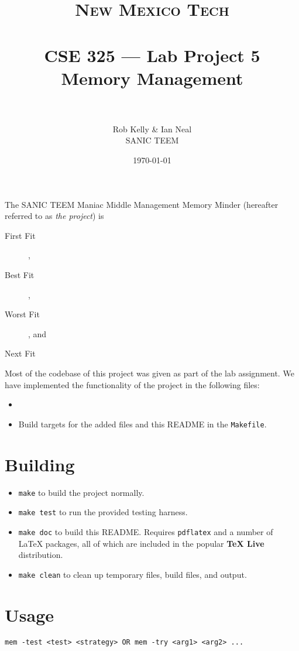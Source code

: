 \documentclass[paper=a4, fontsize=11pt]{scrartcl}
\title{
  \normalfont \normalsize 
  \textsc{New Mexico Tech} \\ [25pt]
  \horrule{0.5pt} \\[0.4cm]
  \huge CSE 325 --- Lab Project 5 \\ Memory Management \\
  \horrule{2pt} \\[0.5cm]
}
\author{Rob Kelly \& Ian Neal \\ SANIC TEEM}
\date{\normalsize\today}
\begin{document}
\maketitle

The SANIC TEEM Maniac Middle Management Memory Minder (hereafter referred to as \textit{the project}) is 

\begin{description}
  \item[First Fit] ,

  \item[Best Fit] ,

  \item[Worst Fit] , and

  \item[Next Fit]
\end{description}

Most of the codebase of this project was given as part of the lab assignment. We have implemented the functionality of the project in the following files:

\begin{itemize}
  \item 

  \item Build targets for the added files and this README in the \texttt{Makefile}.
\end{itemize}

\section*{Building}
\begin{itemize}
  \item \texttt{make} to build the project normally.

  \item \texttt{make test} to run the provided testing harness.

  \item \texttt{make doc} to build this README. Requires \texttt{pdflatex} and a number of \LaTeX\hspace{0em} packages, all of which are included in the popular \textbf{TeX Live} distribution.

  \item \texttt{make clean} to clean up temporary files, build files, and output.
\end{itemize} 

\section*{Usage}
\texttt{mem -test <test> <strategy> OR mem -try <arg1> <arg2> ...}
\end{document}
